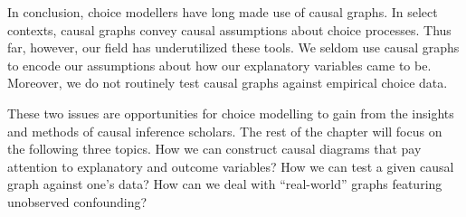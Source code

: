 In conclusion, choice modellers have long made use of causal graphs.
In select contexts, causal graphs convey causal assumptions about choice processes.
Thus far, however, our field has underutilized these tools.
We seldom use causal graphs to encode our assumptions about how our explanatory variables came to be.
Moreover, we do not routinely test causal graphs against empirical choice data.

These two issues are opportunities for choice modelling to gain from the insights and methods of causal inference scholars.
The rest of the chapter will focus on the following three topics.
How we can construct causal diagrams that pay attention to explanatory and outcome variables?
How we can test a given causal graph against one's data?
How can we deal with ``real-world'' graphs featuring unobserved confounding?
